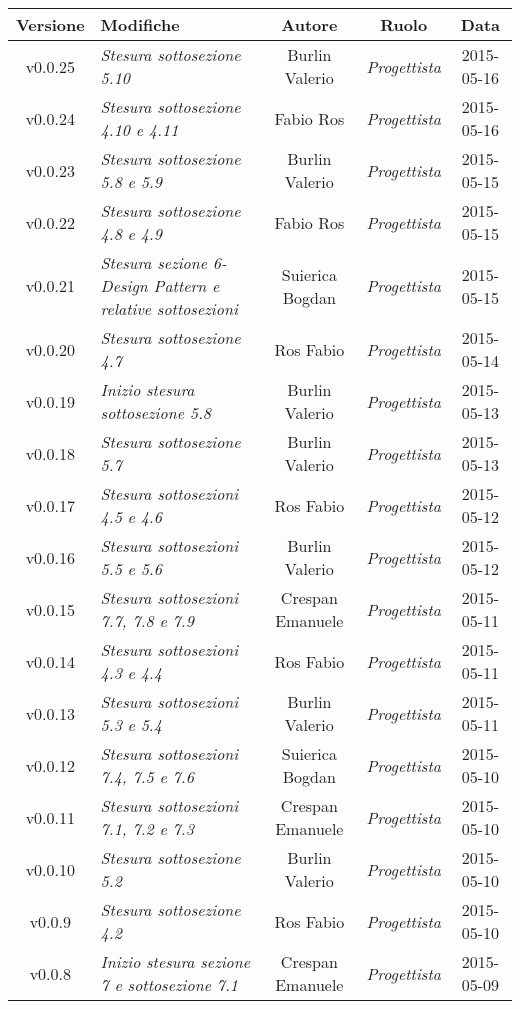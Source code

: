 \newpage

\begin{table}[h]
\centering
\begin{tabular}{|c|p{}|c|c|c|}
	\toprule
	\textbf{Versione} & \textbf{Modifiche} & \textbf{Autore} & \textbf{Ruolo} & \textbf{Data} \\
	\midrule
	\midrule
		v0.0.25 & \textit{Stesura sottosezione 5.10} & Burlin Valerio & \textit{Progettista} & 2015-05-16\\
	\midrule
		v0.0.24 & \textit{Stesura sottosezione 4.10 e 4.11} & Fabio Ros & \textit{Progettista} & 2015-05-16\\
	\midrule
		v0.0.23 & \textit{Stesura sottosezione 5.8 e 5.9} & Burlin Valerio & \textit{Progettista} & 2015-05-15\\
	\midrule
		v0.0.22 & \textit{Stesura sottosezione 4.8 e 4.9} & Fabio Ros & \textit{Progettista} & 2015-05-15\\
	\midrule
		v0.0.21 & \textit{Stesura sezione 6-Design Pattern e relative sottosezioni} & Suierica Bogdan & \textit{Progettista} & 2015-05-15\\
	\midrule
		v0.0.20 & \textit{Stesura sottosezione 4.7} & Ros Fabio & \textit{Progettista} & 2015-05-14\\
	\midrule
		v0.0.19 & \textit{Inizio stesura sottosezione 5.8} & Burlin Valerio & \textit{Progettista} & 2015-05-13\\
	\midrule
		v0.0.18 & \textit{Stesura sottosezione 5.7} & Burlin Valerio & \textit{Progettista} & 2015-05-13\\
	\midrule
		v0.0.17 & \textit{Stesura sottosezioni 4.5 e 4.6} & Ros Fabio & \textit{Progettista} & 2015-05-12\\
	\midrule
		v0.0.16 & \textit{Stesura sottosezioni 5.5 e 5.6} & Burlin Valerio & \textit{Progettista} & 2015-05-12\\
	\midrule
		v0.0.15 & \textit{Stesura sottosezioni 7.7, 7.8 e 7.9} & Crespan Emanuele & \textit{Progettista} & 2015-05-11\\
	\midrule
		v0.0.14 & \textit{Stesura sottosezioni 4.3 e 4.4} & Ros Fabio & \textit{Progettista} & 2015-05-11\\
	\midrule
		v0.0.13 & \textit{Stesura sottosezioni 5.3 e 5.4} & Burlin Valerio & \textit{Progettista} & 2015-05-11\\
	\midrule
		v0.0.12 & \textit{Stesura sottosezioni 7.4, 7.5 e 7.6} & Suierica Bogdan & \textit{Progettista} & 2015-05-10\\
	\midrule
		v0.0.11 & \textit{Stesura sottosezioni 7.1, 7.2 e 7.3} & Crespan Emanuele & \textit{Progettista} & 2015-05-10\\
	\midrule
		v0.0.10 & \textit{Stesura sottosezione 5.2} & Burlin Valerio & \textit{Progettista} & 2015-05-10\\
	\midrule
		v0.0.9 & \textit{Stesura sottosezione 4.2} & Ros Fabio & \textit{Progettista} & 2015-05-10\\
	\midrule
		v0.0.8 & \textit{Inizio stesura sezione 7 e sottosezione 7.1} & Crespan Emanuele & \textit{Progettista} & 2015-05-09\\
	\bottomrule
\end{tabular}
\end{table}


